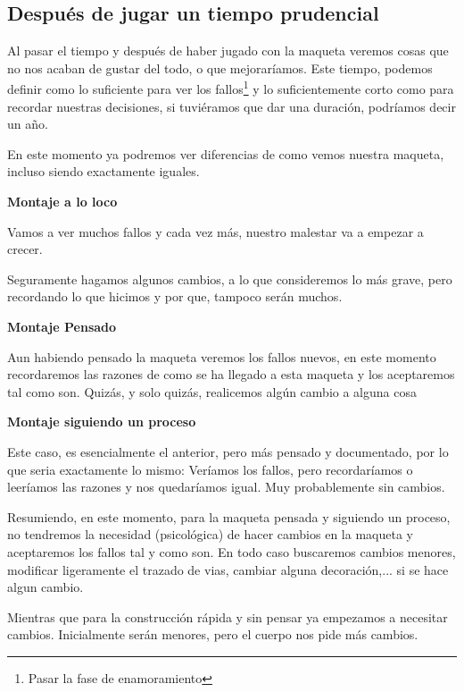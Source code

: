 \subsection{Después de jugar un tiempo prudencial}
Al pasar el tiempo y después de haber jugado con la maqueta veremos cosas que no nos acaban de gustar del todo, o que mejoraríamos. Este tiempo, podemos definir como lo suficiente para ver los fallos\footnote{Pasar la fase de enamoramiento} y lo suficientemente corto como para recordar nuestras decisiones, si tuviéramos que dar una duración, podríamos decir un año.

En este momento ya podremos ver diferencias de como vemos nuestra maqueta, incluso siendo exactamente iguales.

\begin{multicols}{3}
	\textbf{Montaje a lo loco}
	
	Vamos a ver muchos fallos y cada vez más, nuestro malestar va a empezar a crecer.
	
	Seguramente hagamos algunos cambios, a lo que consideremos lo más grave, pero recordando lo que hicimos y por que, tampoco serán muchos.
	
	\columnbreak
	
	\textbf{Montaje Pensado}
	
	Aun habiendo pensado la maqueta veremos los fallos nuevos, en este momento recordaremos las razones de como se ha llegado a esta maqueta y los aceptaremos tal como son. Quizás, y solo quizás, realicemos algún cambio a alguna cosa  
	
	\columnbreak
	
	\textbf{Montaje siguiendo un proceso}
	
	Este caso, es esencialmente el anterior, pero más pensado y documentado, por lo que seria exactamente lo mismo: Veríamos los fallos, pero recordaríamos o leeríamos las razones y nos quedaríamos igual. Muy probablemente sin cambios.
\end{multicols}
	
Resumiendo, en este momento, para la maqueta pensada y siguiendo un proceso, no tendremos la necesidad (psicológica) de hacer cambios en la maqueta y aceptaremos los fallos tal y como son. 
En todo caso buscaremos cambios menores, modificar ligeramente el trazado de vias, cambiar alguna decoración,... si se hace algun cambio.

Mientras que para la construcción rápida y sin pensar ya empezamos a necesitar cambios. Inicialmente serán menores, pero el cuerpo nos pide más cambios.

